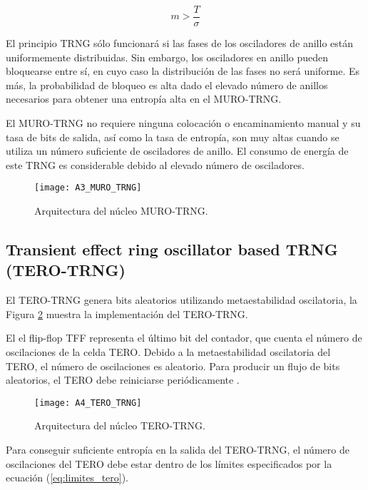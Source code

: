 			    \begin{equation}
			     m > \frac{T}{\sigma} 
			     \label{eq:muro_condicion}
			    \end{equation}	

            El principio TRNG sólo funcionará si las fases de los osciladores de anillo están uniformemente distribuidas. Sin embargo, los osciladores en anillo pueden bloquearse entre sí, en cuyo caso la distribución de las fases no será uniforme. Es más, la probabilidad de bloqueo es alta dado el elevado número de anillos necesarios para obtener una entropía alta en el MURO-TRNG.

            El MURO-TRNG no requiere ninguna colocación o encaminamiento manual y su tasa de bits de salida, así como la tasa de entropía, son muy altas cuando se utiliza un número suficiente de osciladores de anillo. El consumo de energía de este TRNG es considerable debido al elevado número de osciladores.
				
				\begin{figure}[hbtp]
					\caption{Arquitectura del núcleo MURO-TRNG.}
					\centering
					\texttt{[image: A3\_MURO\_TRNG]}
					\label{fig:A3_MURO_TRNG}
				\end{figure}


		\subsection{Transient effect ring oscillator based TRNG (TERO-TRNG)}

            El TERO-TRNG genera bits aleatorios utilizando metaestabilidad oscilatoria, la Figura \ref{fig:A4_TERO_TRNG} muestra la implementación del TERO-TRNG.

            El el flip-flop TFF representa el último bit del contador, que cuenta el número de oscilaciones de la celda TERO. Debido a la metaestabilidad oscilatoria del TERO, el número de oscilaciones es aleatorio. Para producir un flujo de bits aleatorios, el TERO debe reiniciarse periódicamente \cite{Haddad2015}.
	
            \begin{figure}[hbtp]
                \caption{Arquitectura del núcleo TERO-TRNG.}
                \centering
                \texttt{[image: A4\_TERO\_TRNG]}
                \label{fig:A4_TERO_TRNG}
            \end{figure}

            Para conseguir suficiente entropía en la salida del TERO-TRNG, el número de oscilaciones del TERO debe estar dentro de los límites especificados por la ecuación (\ref{eq:limites_tero}).

